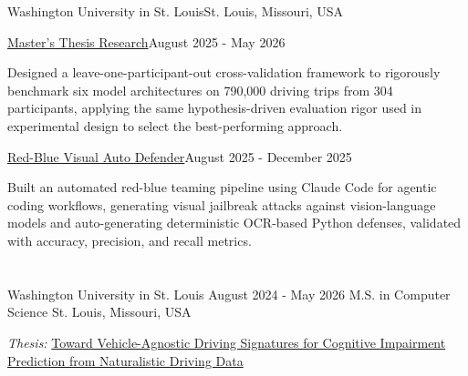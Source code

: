 \documentclass[10pt, letterpaper]{article}
\begin{document}
\vspace{\entrySpacing}
\begin{leadershipentry}{Washington University in St. Louis}{St. Louis, Missouri, USA}
	\begin{positionentry}{\href{https://agreddy.com/projects/ms-thesis}{Master's Thesis Research}}{August 2025 - May 2026}
		\item Designed a leave-one-participant-out cross-validation framework to rigorously benchmark six model architectures on 790,000 driving trips from 304 participants, applying the same hypothesis-driven evaluation rigor used in experimental design to select the best-performing approach.
	\end{positionentry}
	\begin{positionentry}{\href{https://github.com/agopalareddy/visual-jailbreak-defense}{Red-Blue Visual Auto Defender}}{August 2025 - December 2025}
		\item Built an automated red-blue teaming pipeline using Claude Code for agentic coding workflows, generating visual jailbreak attacks against vision-language models and auto-generating deterministic OCR-based Python defenses, validated with accuracy, precision, and recall metrics.
	\end{positionentry}
\end{leadershipentry}

\vspace{\headerSpacing}


\section{}

\vspace{\entrySpacing}
\begin{educationentry}
	{Washington University in St. Louis}
	{August 2024 - May 2026}
	{M.S. in Computer Science}
	{St. Louis, Missouri, USA}
\begin{highlightsforbulletentries}
\item \textit{Thesis:} \href{https://doi.org/10.7936/g95n-fv35}{Toward Vehicle-Agnostic Driving Signatures for Cognitive Impairment Prediction from Naturalistic Driving Data}
\end{highlightsforbulletentries}
\end{educationentry}
\end{document}
